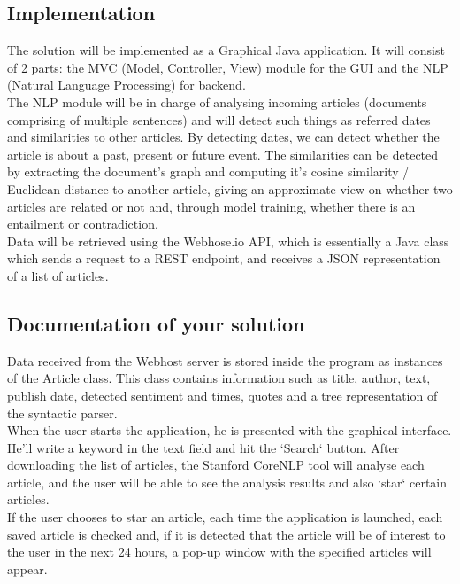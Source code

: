 \documentclass[a4paper,10pt]{article}
\begin{document}
  \subsection{Implementation} 
  The solution will be implemented as a Graphical Java application. It will consist of 2 parts: the MVC (Model, Controller, View) module for the GUI and the NLP (Natural Language Processing) for backend. \\
  The NLP module will be in charge of analysing incoming articles (documents comprising of multiple sentences) and will detect such things as referred dates and similarities to other articles. By detecting dates, we can detect whether the article is about a past, present or future event.
  The similarities can be detected by extracting the document's graph and computing it's cosine similarity / Euclidean distance to another article, giving an approximate view on whether two articles are related or not and, through model training, whether there is an entailment or contradiction. \\
  Data will be retrieved using the Webhose.io API, which is essentially a Java class which sends a request to a REST endpoint, and receives a JSON representation of a list of articles.

  \subsection{Documentation of your solution}
  Data received from the Webhost server is stored inside the program as instances of the Article class.
  This class contains information such as title, author, text, publish date, detected sentiment and times, quotes and a tree representation of the syntactic parser. \\
  When the user starts the application, he is presented with the graphical interface. He'll write a keyword in the text field and hit the `Search` button. After downloading the list of articles, the Stanford CoreNLP tool will analyse each article, and the user will be able to see the analysis results and also `star` certain articles. \\
  If the user chooses to star an article, each time the application is launched, each saved article is checked and, if it is detected that the article will be of interest to the user in the next 24 hours, a pop-up window with the specified articles will appear.
\end{document}
